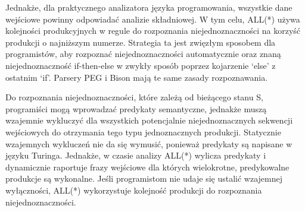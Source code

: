 Jednakże, dla praktycznego analizatora języka programowania,
wszystkie dane wejściowe powinny odpowiadać analizie składniowej.
W tym celu, ALL(*) używa kolejności produkcyjnych w regule do rozpoznania
niejednoznaczności na korzyść produkcji o najniższym numerze.
Strategia ta jest zwięzłym sposobem dla programistów, aby rozpoznać niejednoznaczności
automatycznie oraz znaną niejednoznaczność if-then-else w zwykły sposób
poprzez kojarzenie ‘else’ z ostatnim ‘if’. Parsery PEG i Bison mają te same zasady rozpoznawania.
\par
Do rozpoznania niejednoznaczności, które zależą od bieżącego stanu S, programiści mogą
wprowadzać predykaty semantyczne, jednakże muszą wzajemnie wykluczyć dla wszystkich
potencjalnie niejednoznacznych sekwencji wejściowych do otrzymania tego typu jednoznacznych produkcji.
Statycznie wzajemnych wykluczeń nie da się wymusić, ponieważ predykaty są napisane w języku Turinga.
Jednakże, w czasie analizy ALL(*) wylicza predykaty i dynamicznie raportuje
frazy wejściowe dla których wielokrotne, predykowalne produkcje są wykonalne.
Jeśli programistom nie udaje się ustalić wzajemnej wyłączności, ALL(*)
wykorzystuje kolejność produkcji do rozpoznania niejednoznaczności.
